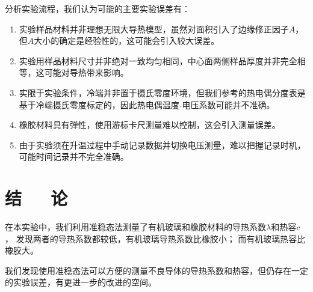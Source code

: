 \documentclass[10pt,a4paper,twocolumn,twoside,UTF8]{ctexart}
\begin{document}
分析实验流程，我们认为可能的主要实验误差有：
\begin{enumerate}[label=\arabic*.]
	\item 实验样品材料并非理想无限大导热模型，虽然对面积引入了边缘修正因子$A$，但$A$大小的确定是经验性的，这可能会引入较大误差。
	\item 实验用样品材料尺寸并非绝对一致均匀相同，中心面两侧样品厚度并非完全相等，这可能对导热带来影响。
	\item 实限于实验条件，冷端并非置于摄氏零度环境，但我们参考的热电偶分度表是基于冷端摄氏零度标定的，因此热电偶温度-电压系数可能并不准确。
	\item 橡胶材料具有弹性，使用游标卡尺测量难以控制，这会引入测量误差。
	\item 由于实验须在升温过程中手动记录数据并切换电压测量，难以把握记录时机，可能时间记录并不完全准确。
\end{enumerate}


\section{结~~~论}
在本实验中，我们利用准稳态法测量了有机玻璃和橡胶材料的导热系数$\lambda$和热容$c$，
发现两者的导热系数都较低，有机玻璃导热系数比橡胶小；
而有机玻璃热容比橡胶大。

我们发现使用准稳态法可以方便的测量不良导体的导热系数和热容，但仍存在一定的实验误差，有更进一步的改进的空间。

\printbibliography[title=参考文献] 
\end{document}
